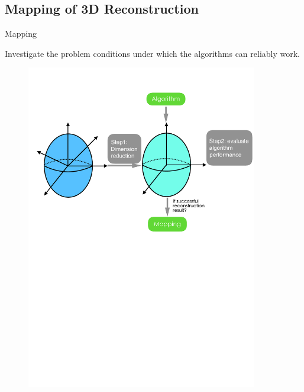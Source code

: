 \documentclass[10pt]{beamer}
\begin{document}
\subsection{Mapping of 3D Reconstruction}
\begin{frame}{Mapping}

Investigate the problem conditions under which the algorithms can reliably work.

\begin{figure}
\centering
\includegraphics[width=0.9\textwidth]{images/mapping_3d_vision.pdf}
\end{figure}


\end{frame}
\end{document}
